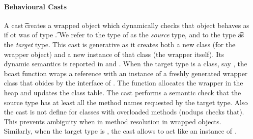 \documentclass[acmlarge, anonymous, authordraft, review]{acmart} %
\begin{document}
\paragraph{Behavioural Casts}\label{p:behcast}
A cast \BehCast\t\a creates a wrapped object \ap which dynamically checks
that object \a behaves as if ot was of type \t.  We refer to the type of \a
as the \emph{source} type, and to the type \t as the \emph{target} type.
This cast is generative as it creates both a new class (for the wrapper
object) and a new instance of that class (the wrapper itself). Its dynamic
semantics is reported in  and .  When the
target type is a class, say \Cp, the bcast function wraps a reference \a
with an instance of a freshly generated wrapper class \D that obides by the
interface of \Cp. The function allocates the wrapper in the heap and updates
the class table.  The cast performs a semantic check that the source type
has at least all the method names requested by the target type.  Also the
cast is not define for classes with overloaded methods (\textsf{nodups}
checks that).  This prevents ambiguity when in method resolution in wrapped
objects. Similarly, when the target type is \any, the cast allows \a to
act like an instance of \any.

\newcommand{\bscast}[2]{\EM{\BehCast{#1}{{#2}}}}
\end{document}
